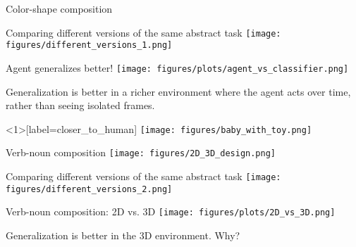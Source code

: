 \documentclass{beamer}
\begin{document}
\begin{frame}{Color-shape composition}
\centering
{}
\end{frame}

\begin{frame}{Comparing different versions of the same abstract task}
\centering
\texttt{[image: figures/different\_versions\_1.png]}
\end{frame}

\begin{frame}{Agent generalizes better!}
\vspace{1em}
\centering
\texttt{[image: figures/plots/agent\_vs\_classifier.png]}
\end{frame}

\begin{frame}[standout]
Generalization is better in a richer environment where the agent acts over time, rather than seeing isolated frames.
\end{frame}

\begin{frame}<1>[label=closer_to_human]
\centering
\texttt{[image: figures/baby\_with\_toy.png]}
\end{frame}

\begin{frame}{Verb-noun composition}
\centering
\texttt{[image: figures/2D\_3D\_design.png]}
\end{frame}

\begin{frame}{Comparing different versions of the same abstract task}
\centering
\texttt{[image: figures/different\_versions\_2.png]}
\end{frame}

\begin{frame}{Verb-noun composition: 2D vs. 3D}
\vspace{1em}
\centering
\texttt{[image: figures/plots/2D\_vs\_3D.png]}
\end{frame}

\begin{frame}[standout]
Generalization is better in the 3D environment. Why?
\end{frame}
\end{document}

